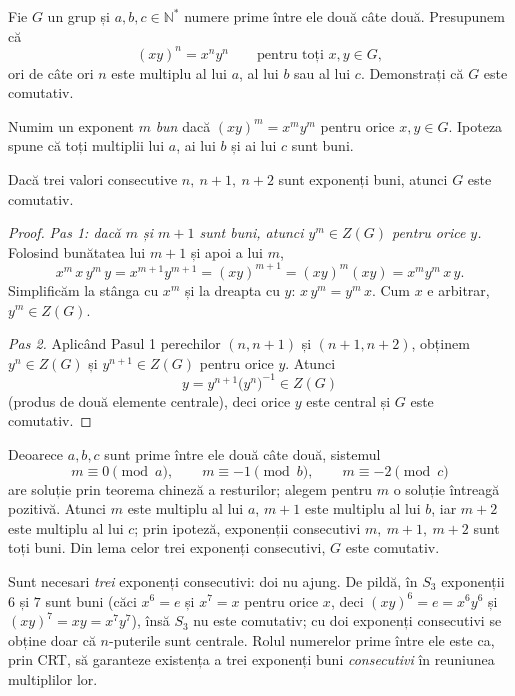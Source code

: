 \begin{problema}
Fie $G$ un grup și $a,b,c\in\mathbb{N}^{*}$ numere prime între ele
două câte două. Presupunem că
\[
  (xy)^{n}=x^{n}y^{n}\qquad\text{pentru toți } x,y\in G,
\]
ori de câte ori $n$ este multiplu al lui $a$, al lui $b$ sau al lui $c$.
Demonstrați că $G$ este comutativ.
\end{problema}

Numim un exponent $m$ \emph{bun} dacă $(xy)^{m}=x^{m}y^{m}$ pentru orice
$x,y\in G$. Ipoteza spune că toți multiplii lui $a$, ai lui $b$
și ai lui $c$ sunt buni.

\begin{lemat}\label{lema:treiexp}
Dacă trei valori consecutive $n,\ n+1,\ n+2$ sunt exponenți buni,
atunci $G$ este comutativ.
\end{lemat}

\begin{proof}
\textit{Pas 1: dacă $m$ și $m+1$ sunt buni, atunci $y^{m}\in Z(G)$
pentru orice $y$.} Folosind bunătatea lui $m+1$ și apoi a lui $m$,
\[
  x^{m}\,x\,y^{m}\,y = x^{m+1}y^{m+1}=(xy)^{m+1}=(xy)^{m}(xy)=x^{m}y^{m}\,x\,y.
\]
Simplificăm la stânga cu $x^{m}$ și la dreapta cu $y$:
$x\,y^{m}=y^{m}\,x$. Cum $x$ e arbitrar, $y^{m}\in Z(G)$.

\textit{Pas 2.} Aplicând Pasul 1 perechilor $(n,n+1)$ și $(n+1,n+2)$,
obținem $y^{n}\in Z(G)$ și $y^{n+1}\in Z(G)$ pentru orice $y$. Atunci
\[
  y = y^{n+1}\bigl(y^{n}\bigr)^{-1}\in Z(G)
\]
(produs de două elemente centrale), deci orice $y$ este central și
$G$ este comutativ.
\end{proof}

\begin{solutie}
Deoarece $a,b,c$ sunt prime între ele două câte două,
sistemul
\[
  m\equiv 0\pmod a,\qquad m\equiv -1\pmod b,\qquad m\equiv -2\pmod c
\]
are soluție prin teorema chineză a resturilor; alegem pentru $m$ o
soluție întreagă pozitivă. Atunci $m$ este multiplu al lui
$a$, $m+1$ este multiplu al lui $b$, iar $m+2$ este multiplu al lui $c$;
prin ipoteză, exponenții consecutivi $m,\ m+1,\ m+2$ sunt toți
buni. Din lema celor trei exponenți consecutivi, $G$ este comutativ.
\end{solutie}

\begin{obs}
Sunt necesari \emph{trei} exponenți consecutivi: doi nu ajung. De pildă,
în $S_{3}$ exponenții $6$ și $7$ sunt buni (căci $x^{6}=e$
și $x^{7}=x$ pentru orice $x$, deci $(xy)^{6}=e=x^{6}y^{6}$ și
$(xy)^{7}=xy=x^{7}y^{7}$), însă $S_{3}$ nu este comutativ; cu doi
exponenți consecutivi se obține doar că $n$-puterile sunt
centrale. Rolul numerelor prime între ele este ca, prin CRT, să
garanteze existența a trei exponenți buni \emph{consecutivi}
în reuniunea multiplilor lor.
\end{obs}


